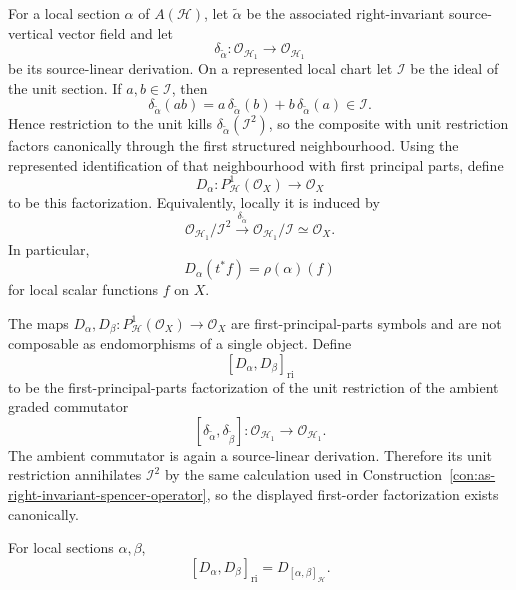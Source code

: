 \begin{construction}
\label{con:as-right-invariant-spencer-operator}
For a local section $\alpha$ of $A(\mathcal H)$, let
$\widetilde\alpha$ be the associated right-invariant source-vertical vector
field and let
\[
    \delta_{\widetilde\alpha}:
    \mathcal O_{\mathcal H_1}
    \longrightarrow
    \mathcal O_{\mathcal H_1}
\]
be its source-linear derivation.  On a represented local chart let
$\mathcal I$ be the ideal of the unit section.  If $a,b\in\mathcal I$, then
\[
    \delta_{\widetilde\alpha}(ab)
    =
    a\,\delta_{\widetilde\alpha}(b)
    +
    b\,\delta_{\widetilde\alpha}(a)
    \in
    \mathcal I.
\]
Hence restriction to the unit kills
$\delta_{\widetilde\alpha}(\mathcal I^2)$, so the composite with unit
restriction factors canonically through the first structured neighbourhood.
Using the represented identification of that neighbourhood with first
principal parts, define
\[
\boxed{
    D_\alpha:
    P^1_{\mathcal H}(\mathcal O_X)
    \longrightarrow
    \mathcal O_X
}
\]
to be this factorization.  Equivalently, locally it is induced by
\[
    \mathcal O_{\mathcal H_1}/\mathcal I^2
    \xrightarrow{\ \delta_{\widetilde\alpha}\ }
    \mathcal O_{\mathcal H_1}/\mathcal I
    \simeq
    \mathcal O_X.
\]
In particular,
\[
    D_\alpha(t^*f)=\rho(\alpha)(f)
\]
for local scalar functions $f$ on $X$.
\end{construction}

\begin{construction}
\label{con:as-classical-commutator-symbol}
The maps
$D_\alpha,D_\beta:P^1_{\mathcal H}(\mathcal O_X)\to\mathcal O_X$ are
first-principal-parts symbols and are not composable as endomorphisms of a
single object.  Define
\[
\boxed{
    [D_\alpha,D_\beta]_{\mathrm{ri}}
}
\]
to be the first-principal-parts factorization of the unit restriction of the
ambient graded commutator
\[
    [\delta_{\widetilde\alpha},
      \delta_{\widetilde\beta}]:
    \mathcal O_{\mathcal H_1}
    \longrightarrow
    \mathcal O_{\mathcal H_1}.
\]
The ambient commutator is again a source-linear derivation.  Therefore its
unit restriction annihilates $\mathcal I^2$ by the same calculation used in
Construction~\ref{con:as-right-invariant-spencer-operator}, so the displayed
first-order factorization exists canonically.
\end{construction}

\begin{proposition}
\label{prop:as-classical-right-invariant-operator}
For local sections $\alpha,\beta$,
\[
\boxed{
    [D_\alpha,D_\beta]_{\mathrm{ri}}
    =
    D_{[\alpha,\beta]_{\mathcal H}}.
}
\]
\end{proposition}

